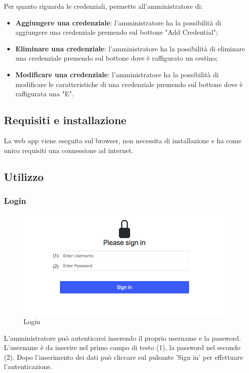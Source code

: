 Per quanto riguarda le credenziali, permette all'amministratore di:
\begin{itemize}
	\item \textbf{Aggiungere una credenziale}: l'amministratore ha la possibilità di aggiungere una credenziale premendo sul bottone "Add Credential"; \\
	\item \textbf{Eliminare una credenziale}: l'amministratore ha la possibilità di eliminare una credenziale premendo sul bottone dove è raffigurato un cestino; \\
	\item \textbf{Modificare una credenziale}:  l'amministratore ha la possibilità di modificare le caratteristiche di una credenziale premendo sul bottone dove è raffigurata una "E". \\
\end{itemize}

\subsection{Requisiti e installazione}
La web app viene eseguita sul browser, non necessita di installazione e ha come unico requisiti una connessione ad internet.

\subsection{Utilizzo}
\subsubsection{Login}
\begin{figure}[H]
	\centering
	\includegraphics[width=15cm]{res/images/login.jpg}
	\caption{Login}
\end{figure}
L'amministratore può autenticarsi inserendo il proprio username e la password. L’username è da inserire nel primo campo di testo (1), la password nel secondo (2). Dopo l’inserimento dei dati può cliccare sul pulsante 'Sign in' per effettuare l'autenticazione.

